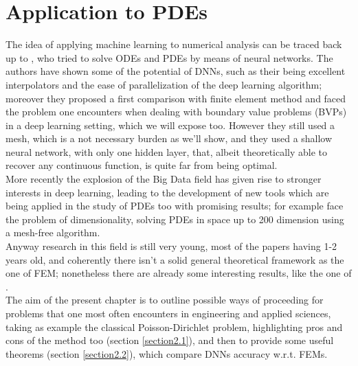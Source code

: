 \documentclass[12pt, a4paper]{report}
\theoremstyle{definition}
\begin{document}
\chapter{Application to PDEs}\label{chapter2}
\setcounter{figure}{5}
The idea of applying machine learning to numerical analysis can be traced back up to \cite{Lagaris}, who tried to solve ODEs and PDEs by means of neural networks. The authors have shown some of the potential of DNNs, such as their being excellent interpolators and the ease of parallelization of the deep learning algorithm; moreover they proposed a first comparison with finite element method and faced the problem one encounters when dealing with boundary value problems (BVPs) in a deep learning setting, which we will expose too. However they still used a mesh, which is a not necessary burden as we'll show, and they used a shallow neural network, with only one hidden layer, that, albeit theoretically able to recover any continuous function, is quite far from being optimal.\\
More recently the explosion of the Big Data field has given rise to stronger interests in deep learning, leading to the development of new tools which are being applied in the study of PDEs too with promising results; for example \cite{Sirignano} face the problem of dimensionality, solving PDEs in space up to 200 dimension using a mesh-free algorithm.\\
Anyway research in this field is still very young, most of the papers having 1-2 years old, and coherently there isn't a solid general theoretical framework as the one of FEM; nonetheless there are already some interesting results, like the one of \cite{Jinchao}.\\
The aim of the present chapter is to outline possible ways of proceeding for problems that one most often encounters in engineering and applied sciences, taking as example the classical Poisson-Dirichlet problem, highlighting pros and cons of the method too (section \ref{section2.1}), and then to provide some useful theorems (section \ref{section2.2}), which compare DNNs accuracy w.r.t. FEMs.
\newpage
\end{document}

